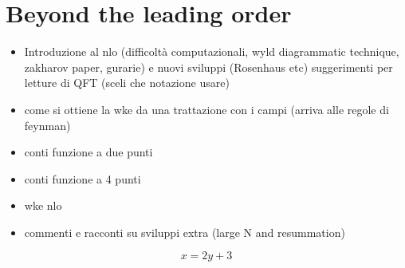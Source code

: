 
\newpage
\vphantom{}
\section{Beyond the leading order}

\begin{itemize}
    \item Introduzione al nlo (difficoltà computazionali, wyld diagrammatic technique, zakharov paper, gurarie) e nuovi sviluppi (Rosenhaus etc)
    suggerimenti per letture di QFT (sceli che notazione usare)
    \item come si ottiene la wke da una trattazione con i campi (arriva alle regole di feynman)
    \item conti funzione a due punti
    \item conti funzione a 4 punti
    \item wke nlo 
    \item commenti e racconti su sviluppi extra (large N and resummation)
\end{itemize}

\begin{equation}
    x = 2y +3 
\end{equation}
